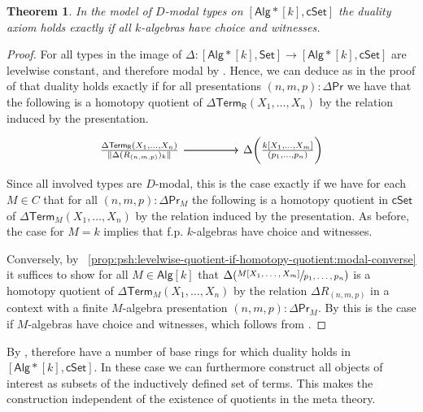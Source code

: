 \documentclass[10pt,a4paper]{article}
\newtheorem{theorem}{Theorem}[section]
\theoremstyle{definition}
\theoremstyle{remark}
\newcommand{\Set}{\mathsf{Set}}
\newcommand{\cSet}{\mathsf{cSet}}
\newcommand{\Alg}{\mathsf{Alg}}
\DeclarePairedDelimiter\paren{(}{)}
\newcommand\R{\mathsf{R}}
\renewcommand\Pr{\mathsf{Pr}}
\newcommand\Term{\mathsf{Term}}
\begin{document}
\begin{theorem}
  In the model of \(D\)-modal types on \([\Alg*[k], \cSet]\) the duality axiom holds exactly if all \(k\)-algebras have choice and witnesses.
\end{theorem}
\begin{proof}
  For all types in the image of \(\Delta \colon [\Alg*[k], \Set] \to [\Alg*[k], \cSet]\) are levelwise constant, and therefore modal by .
  Hence, we can deduce as in the proof of  that duality holds exactly if for all presentations \((n, m, p) \colon \Delta\Pr\) we have that the following is a homotopy quotient of \(\Delta \Term_\R(X_1, \ldots, X_n)\) by the relation induced by the presentation.
  \[\begin{tikzcd}
    {\frac{\Delta \Term_\R(X_1, \ldots, X_n)}{\trunc{\Delta (R_{(n,m,p)})_k}}} && {\Delta\paren[\bigg]{\frac{k[X_1, \ldots, X_m]}{(p_1, \ldots, p_n)}}}
    \arrow[from=1-1, to=1-3]
    \arrow[from=1-1, to=1-3]
  \end{tikzcd}\]
  Since all involved types are \(D\)-modal, this is the case exactly if we have for each \(M \in C\) that for all \((n, m, p) \colon \Delta \Pr_M\) the following is a homotopy quotient in \(\cSet\) of \(\Delta\Term_M(X_1, \ldots, X_n)\) by the relation induced by the presentation.
  As before, the case for \(M = k\) implies that f.p. \(k\)-algebras have choice and witnesses.
  
  Conversely, by ~\ref{prop:psh:levelwise-quotient-if-homotopy-quotient:modal-converse} it suffices to show for all \(M \in \Alg[k]\) that \(\Delta \paren{\sfrac{M[X_1, \ldots, X_m]}{p_1, \ldots, p_n}}\) is a homotopy quotient of \(\Delta\Term_{M}(X_1, \ldots, X_n)\) by the relation \(\Delta R_{(n,m,p)}\) in a context with a finite \(M\)-algebra presentation \((n,m,p) \colon \Delta \Pr_M\).
  By  this is the case if \(M\)-algebras have choice and witnesses, which follows from .
\end{proof}

By , therefore have a number of base rings for which duality holds in \([\Alg*[k], \cSet]\).
In these case we can furthermore construct all objects of interest as subsets of the inductively defined set of terms.
This makes the construction independent of the existence of quotients in the meta theory.
\end{document}
